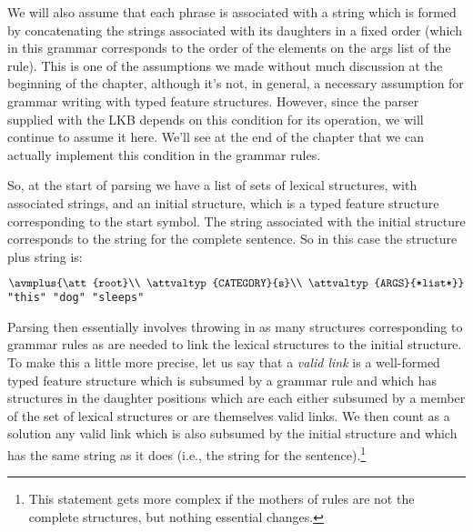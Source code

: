 \documentclass[12pt]{report}
\newcommand{\newterm}[1]{{\it #1}}
\begin{document}
We will
also assume that each phrase is associated with a string
which is formed by concatenating the strings associated with 
its daughters in a fixed order (which in this grammar corresponds
to the order of the elements on the {\feature args} list of the rule).
This is one of the assumptions we made without much discussion
at the beginning of the chapter, although it's not, in general,
a necessary assumption
for grammar writing with typed feature structures.
However, since the parser supplied with the LKB
depends on this condition for its operation, we will continue to
assume it here.  We'll see at the end of the chapter that
we can actually implement this condition in the grammar rules.

So, at the start of parsing we have a list of sets of
lexical structures, with associated strings, and an initial structure,
which is a typed feature structure corresponding to the start
symbol.  The string associated with the initial structure
corresponds to the string for the complete sentence.  So
in this case the structure plus string is:
\begin{center}
{\tiny $\avmplus{\att{root}\\
\attvaltyp{CATEGORY}{s}\\
\attvaltyp{ARGS}{*list*}}$}\\[0.1in]
{\tt "this" "dog" "sleeps"}
\end{center}
Parsing then essentially involves
throwing in as many structures corresponding to
grammar rules as are needed to link
the lexical structures
to the initial structure.
To make this a little more precise,
let us say that a \newterm{valid link}
is a well-formed typed feature structure
which is subsumed by a grammar rule
and which has structures in the daughter positions
which are each either subsumed by a member of the set of lexical
structures or are themselves valid links.
We then count as a solution any valid link which is
also subsumed by the initial structure and which
has the same string as it does
(i.e., the string for the sentence).\footnote{This
statement gets more complex if the mothers of rules are
not the complete structures, but nothing essential changes.}
\end{document}
